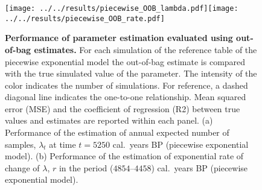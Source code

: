 \documentclass[a4paper]{article}
\begin{document}
\begin{figure}[tbh]
\center\texttt{[image: ../../results/piecewise\_OOB\_lambda.pdf]}\texttt{[image: ../../results/piecewise\_OOB\_rate.pdf]}
\caption{\textbf{Performance of parameter estimation evaluated using out-of-bag estimates.} For each simulation of the reference table of the piecewise exponential model the out-of-bag estimate is compared with the true simulated value of the parameter. The intensity of the color indicates the number of simulations. For reference, a dashed diagonal line indicates the one-to-one relationship. Mean squared error (MSE) and the coefficient of regression (R2) between true values and estimates are reported within each panel. (a) Performance of the estimation of annual expected number of samples, $\lambda_t$ at time $t=5250$ cal.~years BP (piecewise exponential model). (b) Performance of the estimation of exponential rate of change of $\lambda$, $r$ in the period ($4854$--$4458$) cal.~years BP (piecewise exponential model).%
}
\label{fig:OOB}
\end{figure}






\end{document}
